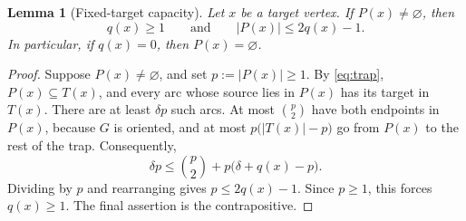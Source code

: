 \documentclass[12pt]{article}
\theoremstyle{plainsl}
\newtheorem{lemma}[theorem]{Lemma}
\theoremstyle{remark}
\begin{document}
\begin{lemma}[Fixed-target capacity]\label{lem:capacity}
Let $x$ be a target vertex.  If $P(x)\ne\varnothing$, then
\[
 q(x)\ge1
 \qquad\text{and}\qquad
 |P(x)|\le2q(x)-1.
\]
In particular, if $q(x)=0$, then $P(x)=\varnothing$.
\end{lemma}

\begin{proof}
Suppose $P(x)\ne\varnothing$, and set $p:=|P(x)|\ge1$.
By \eqref{eq:trap}, $P(x)\subseteq T(x)$, and every arc whose source lies in
$P(x)$ has its target in $T(x)$.
There are at least $\delta p$ such arcs.  At most
$\binom{p}{2}$ have both endpoints in $P(x)$, because $G$ is oriented, and at
most $p\bigl(|T(x)|-p\bigr)$ go from $P(x)$ to the rest of the trap.
Consequently,
\[
 \delta p
 \le \binom{p}{2}
    +p\bigl(\delta+q(x)-p\bigr).
\]
Dividing by $p$ and rearranging gives $p\le2q(x)-1$.  Since $p\ge1$, this
forces $q(x)\ge1$.  The final assertion is the contrapositive.
\end{proof}
\end{document}

